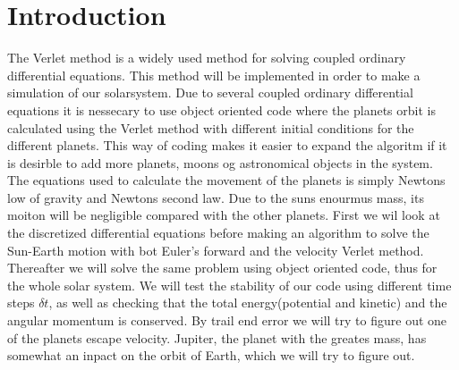 \documentclass[../main.tex]{subfiles}
\begin{document}
\section{Introduction}\label{introduction}
The Verlet method is a widely used method for solving coupled ordinary differential equations. This method will be implemented  in order to make a simulation of our solarsystem. Due to several coupled ordinary differential equations it is nessecary to use object oriented code where the planets orbit is calculated using the Verlet method with different initial conditions for the different planets. This way of coding makes it easier to expand the algoritm if it is desirble to add more planets, moons og astronomical objects in the system. The equations used to calculate the movement of the planets is simply Newtons low of gravity and Newtons second law. Due to the suns enourmus mass, its moiton will be negligible compared with the other planets.
First we wil look at the discretized differential equations before making an algorithm to solve the Sun-Earth motion with bot Euler's forward and the velocity Verlet method. Thereafter we will solve the same problem using object oriented code, thus for the whole solar system. We will test the stability of our code using different time steps $\delta t$, as well as checking that the total energy(potential and kinetic) and the angular momentum is conserved. By trail end error we will try to figure out one of the planets escape velocity.
Jupiter, the planet with the greates mass, has somewhat an inpact on the orbit of Earth, which we will try to figure out. 
\end{document}
